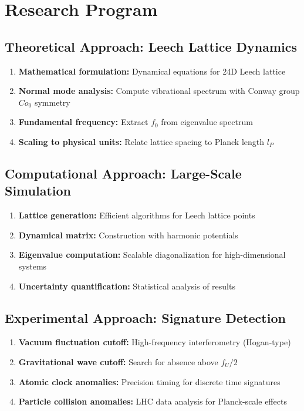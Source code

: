 \documentclass[11pt]{article}
\begin{document}
\section{Research Program}

\subsection{Theoretical Approach: Leech Lattice Dynamics}
\begin{enumerate}
\item \textbf{Mathematical formulation:} Dynamical equations for 24D Leech lattice
\item \textbf{Normal mode analysis:} Compute vibrational spectrum with Conway group $Co_0$ symmetry
\item \textbf{Fundamental frequency:} Extract $f_0$ from eigenvalue spectrum
\item \textbf{Scaling to physical units:} Relate lattice spacing to Planck length $l_P$
\end{enumerate}

\subsection{Computational Approach: Large-Scale Simulation}
\begin{enumerate}
\item \textbf{Lattice generation:} Efficient algorithms for Leech lattice points
\item \textbf{Dynamical matrix:} Construction with harmonic potentials
\item \textbf{Eigenvalue computation:} Scalable diagonalization for high-dimensional systems
\item \textbf{Uncertainty quantification:} Statistical analysis of results
\end{enumerate}

\subsection{Experimental Approach: Signature Detection}
\begin{enumerate}
\item \textbf{Vacuum fluctuation cutoff:} High-frequency interferometry (Hogan-type)
\item \textbf{Gravitational wave cutoff:} Search for absence above $f_U/2$
\item \textbf{Atomic clock anomalies:} Precision timing for discrete time signatures
\item \textbf{Particle collision anomalies:} LHC data analysis for Planck-scale effects
\end{enumerate}
\end{document}
